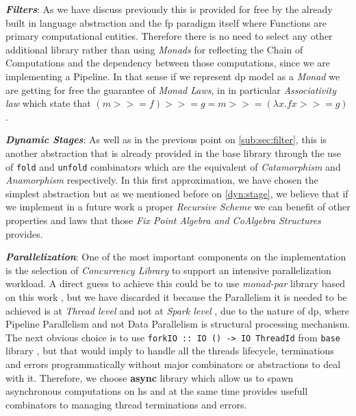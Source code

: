 \documentclass[preprint]{elsarticle}
\begin{document}
\textbf{\textit{Filters}}\label{sub:sec:filter}: As we have discuss previously this is provided for free by the already built in language abstraction and the \acrshort{fp} paradigm itself where Functions are primary computational entities. Therefore there is no need to select any other additional library rather than using \emph{Monads} \citep{monads} for reflecting the Chain of Computations and the dependency between those computations, since we are implementing a Pipeline. In that sense if we represent \acrshort{dp} model as a \emph{Monad} we are getting for free the guarantee of \emph{Monad Laws}, in in particular \emph{Associativity law} which state that $(m >>= f ) >>= g = m >>= (\lambda x.f x >>= g)$ \citep{monadlaws}.

\textbf{\textit{Dynamic Stages}}: As well as in the previous point on \autoref{sub:sec:filter}, this is another abstraction that is already provided in the base library through the use of \texttt{fold} and \texttt{unfold} combinators which are the equivalent of \emph{Catamorphism} and \emph{Anamorphism} respectively. In this first approximation, we have chosen the simplest abstraction but as we mentioned before on \autoref{dyn:stage}, we believe that if we implement in a future work a proper \emph{Recursive Scheme} we can benefit of other properties and laws that those \emph{Fix Point Algebra and CoAlgebra Structures} \citep{lenses} provides. 

\textbf{\textit{Parallelization}}: One of the most important components on the implementation is the selection of \emph{Concurrency Library} to support an intensive parallelization workload. A direct guess to achieve this could be to use \textit{monad-par} library based on this work \citep{monadpar}, but we have discarded it because the Parallelism it is needed to be achieved is at \emph{Thread level} and not at \emph{Spark level} \cite{sparks}, due to the nature of \acrshort{dp}, where Pipeline Parallelism and not Data Parallelism is structural processing mechanism. The next obvious choice is to use \texttt{forkIO :: IO () -> IO ThreadId} from \texttt{base} library \cite{forkio}, but that would imply to handle all the threads lifecycle, terminations and errors programmatically without major combinators or abstractions to deal with it. Therefore, we choose \textbf{async} \cite{async}
library which allow us to spawn asynchronous computations \citep{parallelbook} on \acrshort{hs} and at the same time provides usefull combinators to managing thread terminations and errors.
\end{document}
